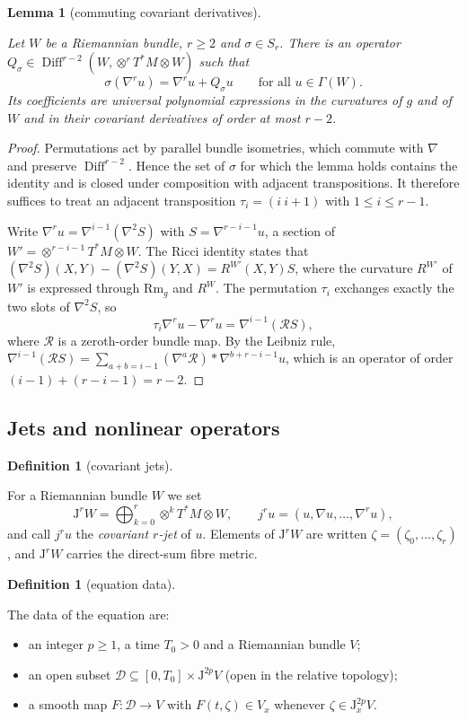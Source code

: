 \documentclass[11pt,reqno]{amsart}
\newtheorem{lemma}[theorem]{Lemma}
\theoremstyle{definition}
\newtheorem{definition}[theorem]{Definition}
\theoremstyle{remark}
\newcommand{\Dom}{\mathcal{D}}
\newcommand{\Jet}{\mathrm{J}}
\newcommand{\Diff}{\operatorname{Diff}}
\newcommand{\lean}[1]{}
\newcommand{\uses}[1]{}
\numberwithin{equation}{section}
\begin{document}
\begin{lemma}[commuting covariant derivatives]\label{lem:ricci}
\lean{ShortTime.permute_iteratedCovGrad}
Let $W$ be a Riemannian bundle, $r\ge2$ and $\sigma\in S_r$. There is an operator
$Q_\sigma\in\Diff^{r-2}(W,\otimes^rT^*M\otimes W)$ such that
\[
  \sigma(\nabla^r u)=\nabla^r u+Q_\sigma u\qquad\text{for all }u\in\Gamma(W).
\]
Its coefficients are universal polynomial expressions in the curvatures of $g$ and of $W$ and in their
covariant derivatives of order at most $r-2$.
\end{lemma}

\begin{proof}
Permutations act by parallel bundle isometries, which commute with $\nabla$ and preserve
$\Diff^{r-2}$. Hence the set of $\sigma$ for which the lemma holds contains the identity and is closed
under composition with adjacent transpositions. It therefore suffices to treat an adjacent
transposition $\tau_i=(i\ i{+}1)$ with $1\le i\le r-1$.

Write $\nabla^r u=\nabla^{i-1}(\nabla^2S)$ with $S=\nabla^{r-i-1}u$, a section of
$W'=\otimes^{r-i-1}T^*M\otimes W$. The Ricci identity states that
$(\nabla^2S)(X,Y)-(\nabla^2S)(Y,X)=R^{W'}(X,Y)S$, where the curvature $R^{W'}$ of $W'$ is expressed
through $\mathrm{Rm}_g$ and $R^W$. The permutation $\tau_i$ exchanges exactly the two slots of
$\nabla^2S$, so
\[
  \tau_i\nabla^ru-\nabla^ru=\nabla^{i-1}(\mathcal{R}S),
\]
where $\mathcal{R}$ is a zeroth-order bundle map. By the Leibniz rule,
$\nabla^{i-1}(\mathcal{R}S)=\sum_{a+b=i-1}(\nabla^a\mathcal R)*\nabla^{b+r-i-1}u$, which is an
operator of order $(i-1)+(r-i-1)=r-2$.
\end{proof}

\subsection{Jets and nonlinear operators}

\begin{definition}[covariant jets]\label{def:jet}
\lean{ShortTime.CovJetFiber, ShortTime.covJet}
For a Riemannian bundle $W$ we set
\[
  \Jet^rW=\bigoplus_{k=0}^r\otimes^kT^*M\otimes W,\qquad
  j^ru=(u,\nabla u,\dots,\nabla^ru),
\]
and call $j^ru$ the \emph{covariant $r$-jet} of $u$. Elements of $\Jet^rW$ are written
$\zeta=(\zeta_0,\dots,\zeta_r)$, and $\Jet^rW$ carries the direct-sum fibre metric.
\end{definition}

\begin{definition}[equation data]\label{def:data}
\lean{ShortTime.EquationData, ShortTime.localDom, ShortTime.localRep}
\uses{def:jet}
The data of the equation are:
\begin{itemize}[nosep]
\item an integer $p\ge1$, a time $T_0>0$ and a Riemannian bundle $V$;
\item an open subset $\Dom\subseteq[0,T_0]\times\Jet^{2p}V$ (open in the relative topology);
\item a smooth map $F\colon\Dom\to V$ with $F(t,\zeta)\in V_x$ whenever $\zeta\in\Jet^{2p}_xV$.
\end{itemize}
\end{definition}
\end{document}
